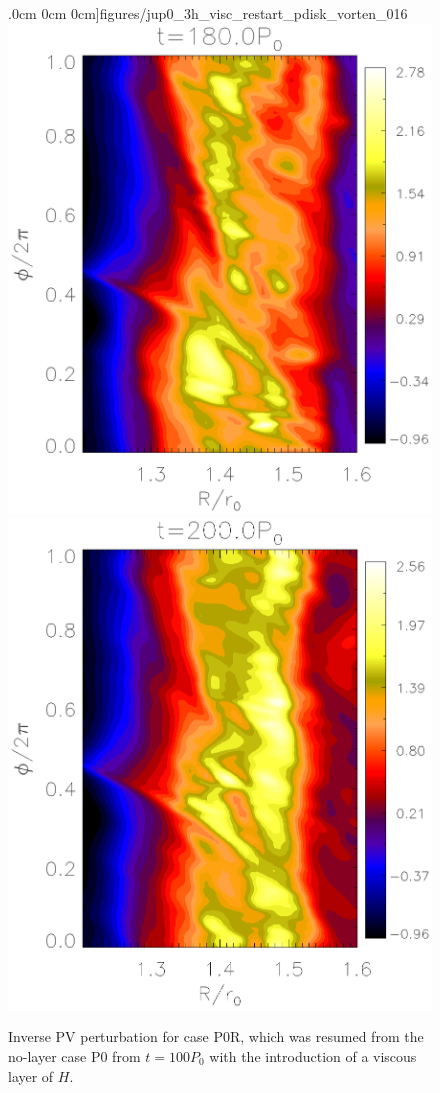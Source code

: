\begin{figure}
    .0cm 0cm 0cm]{figures/jup0_3h_visc_restart_pdisk_vorten_016}\includegraphics[scale=.43,clip=true,trim=2.3cm
    .0cm 0cm 0cm]{figures/jup0_3h_visc_restart_pdisk_vorten_018}\includegraphics[scale=.43,clip=true,trim=2.3cm
    .0cm 0cm 0cm]{figures/jup0_3h_visc_restart_pdisk_vorten_020}
  \caption{Inverse PV perturbation for case P0R, which was resumed
    from the no-layer case P0 from $t=100P_0$ with the introduction of
    a viscous layer of $H$. 
    \label{jup0_3h_visc_restart_vorten}}
\end{figure}

